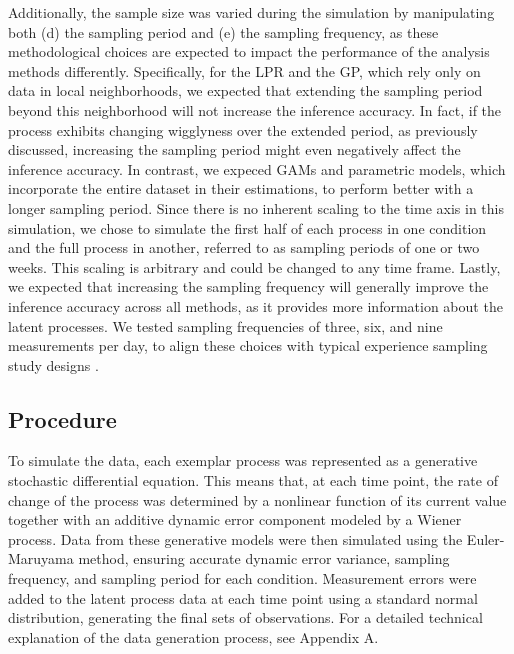 \documentclass[man, floatsintext]{apa7}
\begin{document}
Additionally, the sample size was varied during the simulation by manipulating
both (d)
the sampling period and (e) the sampling frequency, as these methodological
choices are expected to impact the performance of the analysis methods
differently. Specifically, for the LPR and the GP, which rely only on data in
local neighborhoods, we expected that extending the sampling period beyond this
neighborhood will not increase the inference accuracy.
In fact, if the process exhibits
changing wigglyness over the extended period, as previously discussed,
increasing the sampling period might even negatively affect the inference
accuracy. In contrast, we expeced GAMs and parametric models, which incorporate
the entire dataset in their estimations, to perform better with a longer
sampling period. Since there is no inherent scaling to the time axis in this
simulation, we chose to simulate the first half of each process in one
condition and the full process in another, referred to as sampling periods of
one or two weeks. This scaling is arbitrary and could be changed to any time
frame. Lastly, we expected that increasing the sampling frequency will
generally improve the inference accuracy across all methods, as it provides
more information about the latent processes.
We tested sampling frequencies of three, six, and nine measurements per day,
to align these choices with typical experience sampling study designs
\parencite{wrzus_ecological_2023}.

\subsection{Procedure}

To simulate the data, each exemplar process was represented as a generative
stochastic differential equation. This means that, at each time point,
the rate of change of the
process was determined by a nonlinear function of its current value together
with an
additive dynamic error component modeled by a Wiener process. Data from these
generative models were then simulated using the Euler-Maruyama method, ensuring
accurate dynamic error variance, sampling frequency, and sampling period for
each condition. Measurement errors were added to the latent process data at
each time point using a standard normal distribution, generating the final sets
of observations. For a detailed technical explanation of the data generation
process, see Appendix A.
\end{document}
